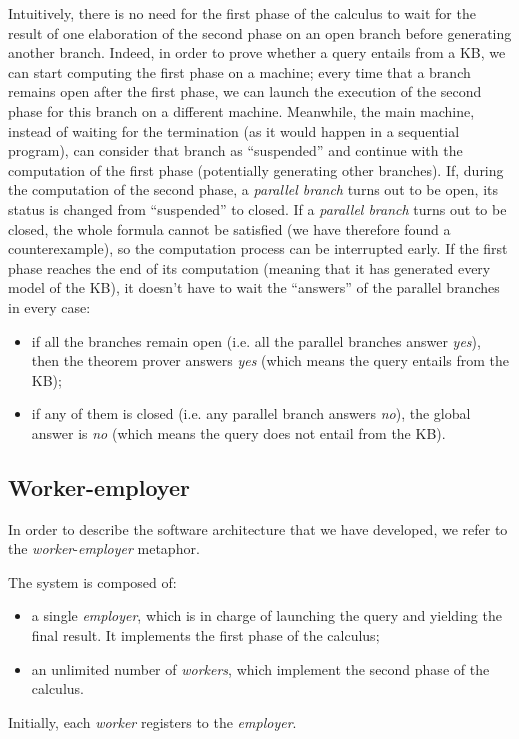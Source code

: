 \documentclass[a4paper, 11pt, oneside]{elsarticle}
\begin{document}
Intuitively, there is no need for the first phase of the calculus to wait for the result of one elaboration of the second phase on an open branch before generating another branch.
Indeed, in order to prove whether a query entails from a KB, we can start computing the first phase on a machine; every time that a branch remains open after the first phase, we can launch the execution of the second phase for this branch on a different machine.
Meanwhile, the main machine, instead of waiting for the termination (as it would happen in a sequential program), can consider that branch as ``suspended'' and continue with the computation of the first phase (potentially generating other branches).
If, during the computation of the second phase, a \emph{parallel branch} turns out to be open, its status is changed from ``suspended'' to closed.
If a \emph{parallel branch} turns out to be closed, the whole formula cannot be satisfied (we have therefore found a counterexample), so the computation process can be interrupted early.
If the first phase reaches the end of its computation (meaning that it has generated every model of the KB), it doesn't have to wait the ``answers'' of the parallel branches in every case:
\begin{itemize}
\item if all the branches remain open (i.e. all the parallel branches answer \emph{yes}), then the theorem prover answers \emph{yes} (which means the query entails from the KB);
\item if any of them is closed (i.e. any parallel branch answers \emph{no}), the global answer is \emph{no} (which means the query does not entail from the KB).
\end{itemize}

\subsection{Worker-employer}\label{workemp}

In order to describe the software architecture that we have developed, we refer to the \emph{worker}-\emph{employer} metaphor.

The system is composed of:
\begin{itemize}
\item a single \emph{employer}, which is in charge of launching the query and yielding the final result. It implements the first phase of the calculus;
\item an unlimited number of \emph{workers}, which implement the second phase of the calculus.
\end{itemize}
Initially, each \emph{worker} registers to the \emph{employer}.
\end{document}
